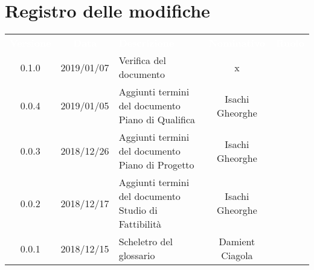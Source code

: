 
\section*{Registro delle modifiche}
{
	\renewcommand{\arraystretch}{1.5}
	\centering
	\begin{longtable}{ c c  C{4cm}  c  c }
		
		\textcolor{white}{\textbf{Versione}} & \textcolor{white}{\textbf{Data}} & \textcolor{white}{\textbf{Descrizione}} & \textcolor{white}{\textbf{Nominativo}} & \textcolor{white}{\textbf{Ruolo}}\\
						
		0.1.0 & 2019/01/07 & Verifica del documento & x & \ver{}\\
				
		0.0.4 & 2019/01/05 & Aggiunti termini del documento Piano di Qualifica & Isachi Gheorghe &\ana{}\\
				
		0.0.3 & 2018/12/26 &Aggiunti termini del documento Piano di Progetto & Isachi Gheorghe & \ana{}\\
				
		0.0.2 & 2018/12/17 & Aggiunti termini del documento Studio di Fattibilità & Isachi Gheorghe &\ana{}\\
		
		0.0.1 & 2018/12/15 & Scheletro del glossario & Damient Ciagola & \ana{}\\
		
	\end{longtable}

}